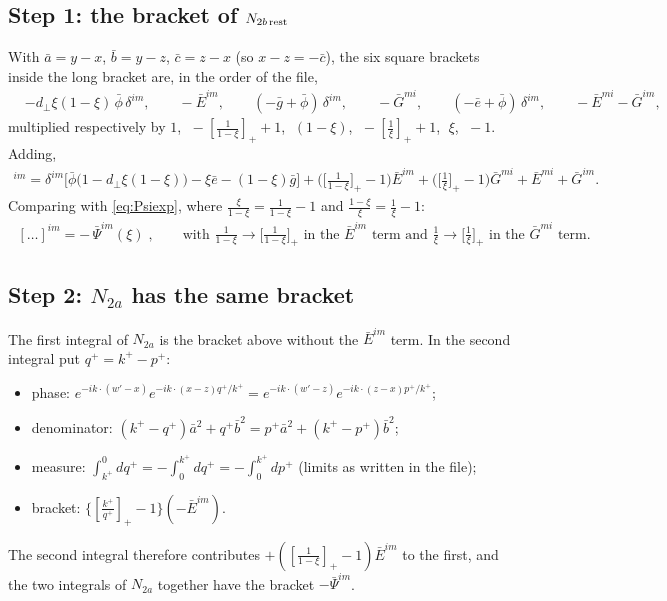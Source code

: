 \documentclass[10pt]{article}
\numberwithin{equation}{section}
\begin{document}
\subsection{Step 1: the bracket of $N_{2b\,\rm rest}$}
With $\bar a=y-x$, $\bar b=y-z$, $\bar c=z-x$ (so $x-z=-\bar c$), the six square brackets inside the long bracket are, in the order of the file,
\begin{align}
&-d_{\perp}\xi(1-\xi)\,\bar\phi\,\delta^{im},\qquad -\bar E^{im},\qquad (-\bar g+\bar\phi)\,\delta^{im},\qquad -\bar G^{mi},\qquad (-\bar e+\bar\phi)\,\delta^{im},\qquad -\bar E^{mi}-\bar G^{im},
\end{align}
multiplied respectively by $1$, $\;-[\frac{1}{1-\xi}]_{+}+1$, $\;(1-\xi)$, $\;-[\frac1\xi]_{+}+1$, $\;\xi$, $\;-1$. Adding,
\begin{align}
[\dots]^{im}=\delta^{im}\Big[\bar\phi\big(1-d_{\perp}\xi(1-\xi)\big)-\xi\bar e-(1-\xi)\bar g\Big]
+\Big(\Big[\tfrac{1}{1-\xi}\Big]_{+}-1\Big)\bar E^{im}+\Big(\Big[\tfrac1\xi\Big]_{+}-1\Big)\bar G^{mi}+\bar E^{mi}+\bar G^{im}.
\end{align}
Comparing with \eqref{eq:Psiexp}, where $\frac{\xi}{1-\xi}=\frac{1}{1-\xi}-1$ and $\frac{1-\xi}{\xi}=\frac1\xi-1$:
\begin{align}
\boxed{\;[\dots]^{im}=-\,\bar\Psi^{im}(\xi)\;},\qquad\text{with }\frac{1}{1-\xi}\to\Big[\frac{1}{1-\xi}\Big]_{+}\text{ in the }\bar E^{im}\text{ term and }\frac1\xi\to\Big[\frac1\xi\Big]_{+}\text{ in the }\bar G^{mi}\text{ term}.
\end{align}

\subsection{Step 2: $N_{2a}$ has the same bracket}
The first integral of $N_{2a}$ is the bracket above without the $\bar E^{im}$ term. In the second integral put $q^{+}=k^{+}-p^{+}$:
\begin{itemize}
\item phase: $e^{-ik\cdot(w'-x)}e^{-ik\cdot(x-z)q^{+}/k^{+}}=e^{-ik\cdot(w'-z)}e^{-ik\cdot(z-x)p^{+}/k^{+}}$;
\item denominator: $(k^{+}-q^{+})\bar a^{2}+q^{+}\bar b^{2}=p^{+}\bar a^{2}+(k^{+}-p^{+})\bar b^{2}$;
\item measure: $\int^{0}_{k^{+}}dq^{+}=-\int_{0}^{k^{+}}dq^{+}=-\int_{0}^{k^{+}}dp^{+}$ (limits as written in the file);
\item bracket: $\{[\frac{k^{+}}{q^{+}}]_{+}-1\}(-\bar E^{im})$.
\end{itemize}
The second integral therefore contributes $+([\frac{1}{1-\xi}]_{+}-1)\bar E^{im}$ to the first, and the two integrals of $N_{2a}$ together have the bracket $-\bar\Psi^{im}$.
\end{document}
